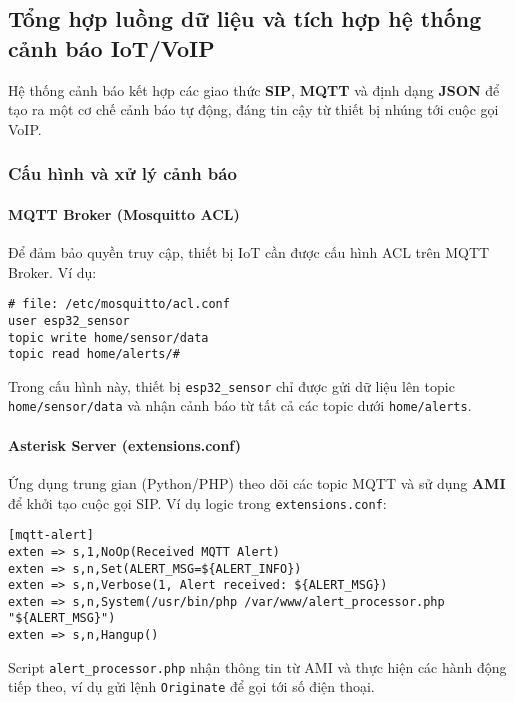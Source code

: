 \subsection{Tổng hợp luồng dữ liệu và tích hợp hệ thống cảnh báo IoT/VoIP}
\label{subsec:system_integration}

Hệ thống cảnh báo kết hợp các giao thức \textbf{SIP}, \textbf{MQTT} và định dạng \textbf{JSON} để tạo ra một cơ chế cảnh báo tự động, đáng tin cậy từ thiết bị nhúng tới cuộc gọi VoIP.

\subsubsection{Cấu hình và xử lý cảnh báo}
\paragraph{MQTT Broker (Mosquitto ACL)}
Để đảm bảo quyền truy cập, thiết bị IoT cần được cấu hình ACL trên MQTT Broker. Ví dụ:
\begin{verbatim}
# file: /etc/mosquitto/acl.conf
user esp32_sensor
topic write home/sensor/data
topic read home/alerts/#
\end{verbatim}
Trong cấu hình này, thiết bị \texttt{esp32\_sensor} chỉ được gửi dữ liệu lên topic \texttt{home/sensor/data} và nhận cảnh báo từ tất cả các topic dưới \texttt{home/alerts}.

\paragraph{Asterisk Server (extensions.conf)}
Ứng dụng trung gian (Python/PHP) theo dõi các topic MQTT và sử dụng \textbf{AMI} để khởi tạo cuộc gọi SIP. Ví dụ logic trong \texttt{extensions.conf}:
\begin{verbatim}
[mqtt-alert]
exten => s,1,NoOp(Received MQTT Alert)
exten => s,n,Set(ALERT_MSG=${ALERT_INFO})
exten => s,n,Verbose(1, Alert received: ${ALERT_MSG})
exten => s,n,System(/usr/bin/php /var/www/alert_processor.php "${ALERT_MSG}")
exten => s,n,Hangup()
\end{verbatim}
Script \texttt{alert\_processor.php} nhận thông tin từ AMI và thực hiện các hành động tiếp theo, ví dụ gửi lệnh \texttt{Originate} để gọi tới số điện thoại.

